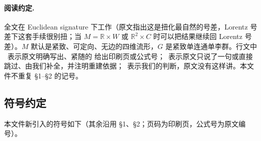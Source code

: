 \paragraph{阅读约定.}
全文在 Euclidean signature 下工作（原文指出这是扭化最自然的号差，Lorentz 号差下这套手续很别扭；当 $M=\mathbb R\times W$ 或 $\mathbb R^2\times C$ 时可以把结果继续回 Lorentz 号差）\pA{}。$M$ 默认是紧致、可定向、无边的四维流形，$G$ 是紧致单连通单李群。行文中 \pA\ 表示原文明确写出、紧随的 \anchor{} 给出印刷页或公式号；\pB\ 表示原文只说了一句或直接跳过、由我们补全，并注明重建依据；\pC\ 表示我们的判断，原文没有这样讲。本文件不重复 §1–§2 的记号。

\subsection{符号约定}

本文件新引入的符号如下（其余沿用 §1、§2；页码为印刷页，公式号为原文编号）。

